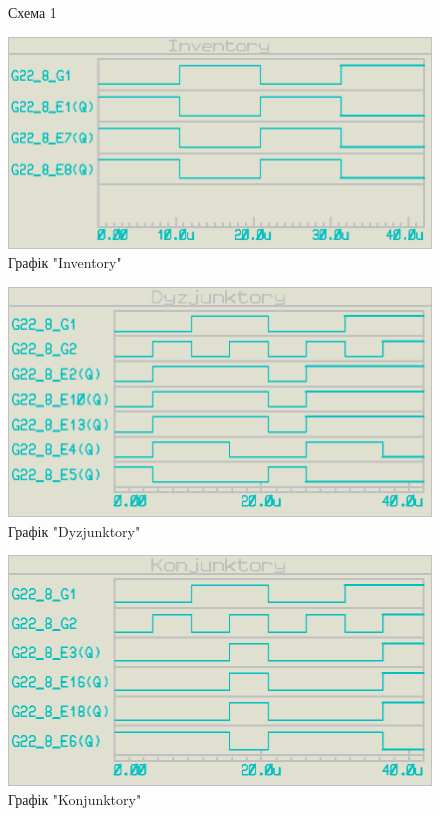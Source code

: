 \documentclass{article}
\begin{document}
\begin{normalsize}
\begin{figure}[H]
		\caption{Схема 1}
	\end{figure}
	\begin{figure}[H]
		\centering
		\includegraphics[scale=0.57]{g1}
		\caption{Графік "Inventory"}
	\end{figure}
	\begin{figure}[H]
		\centering
		\includegraphics[scale=0.57]{g2}
		\caption{Графік "Dyzjunktory"}
	\end{figure}
	\begin{figure}[H]
		\centering
		\includegraphics[scale=0.57]{g3}
		\caption{Графік "Konjunktory"}
	\end{figure}


\end{normalsize}
\end{document}

